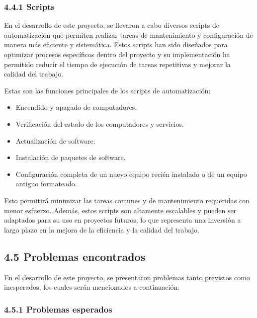 \begin{spacing}{1.5}
  \subsubsection{4.4.1 Scripts}

  En el desarrollo de este proyecto, se llevaron a cabo diversos scripts de
  automatización que permiten realizar tareas de mantenimiento y configuración
  de
  manera más eficiente y sistemática. Estos scripts han sido diseñados para
  optimizar procesos específicos dentro del proyecto y su implementación ha
  permitido reducir el tiempo de ejecución de tareas repetitivas y mejorar la
  calidad del trabajo.

  Estas son las funciones principales de los scripts de automatización:

  \begin{itemize}
    \item Encendido y apagado de computadores.
    \item Verificación del estado de los computadores y servicios.
    \item Actualización de software.
    \item Instalación de paquetes de software.
    \item Configuración completa de un nuevo equipo recién instalado o de
          un equipo antiguo formateado.
  \end{itemize}

  Esto permitirá minimizar las tareas comunes y de mantenimiento requeridas
  con menor esfuerzo. Además, estos scripts son altamente escalables y pueden
  ser
  adaptados para su uso en proyectos futuros, lo que representa una inversión a
  largo plazo en la mejora de la eficiencia y la calidad del trabajo.\cite{github}

  \subsection{4.5 Problemas encontrados}
  En el desarrollo de este proyecto, se presentaron problemas tanto previstos
  como inesperados, los cuales serán mencionados a continuación.

  \subsubsection{4.5.1 Problemas esperados}


\end{spacing}
